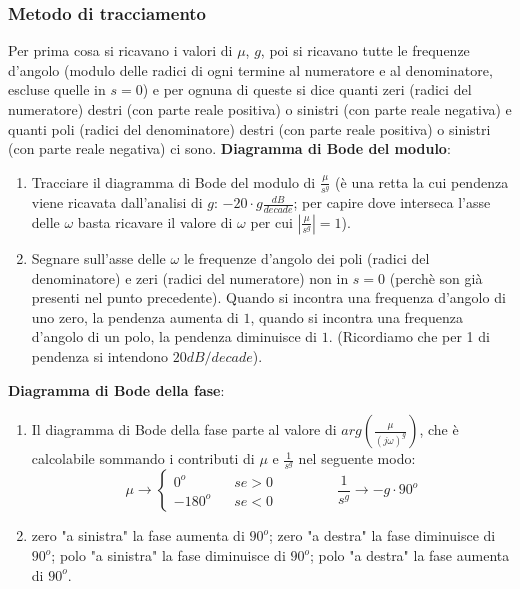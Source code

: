 \subsubsection{Metodo di tracciamento}
Per prima cosa si ricavano i valori di $\mu$, $g$, poi si ricavano tutte le frequenze d'angolo (modulo delle radici di ogni termine al numeratore e al denominatore, escluse quelle in $s=0$) e per ognuna di queste si dice quanti zeri (radici del numeratore) destri (con parte reale positiva) o sinistri (con parte reale negativa) e quanti poli (radici del denominatore) destri (con parte reale positiva) o sinistri (con parte reale negativa) ci sono.\newline
\textbf{Diagramma di Bode del modulo}: 
\begin{enumerate}
    \item Tracciare il diagramma di Bode del modulo di $\frac{\mu}{s^g}$ (è una retta la cui pendenza viene ricavata dall'analisi di $g$: $-20 \cdot g \frac{dB}{decade}$; per capire dove interseca l'asse delle $\omega$ basta ricavare il valore di $\omega$ per cui $\left| \frac{\mu}{s^g} \right| = 1$).
    \item Segnare sull'asse delle $\omega$ le frequenze d'angolo dei poli (radici del denominatore) e zeri (radici del numeratore) non in $s=0$ (perchè son già presenti nel punto precedente).\newline
    Quando si incontra una frequenza d'angolo di uno zero, la pendenza aumenta di $1$, quando si incontra una frequenza d'angolo di un polo, la pendenza diminuisce di $1$. (Ricordiamo che per 1 di pendenza si intendono $20 dB/decade$).
\end{enumerate}
\textbf{Diagramma di Bode della fase}:
\begin{enumerate}
    \item Il diagramma di Bode della fase parte al valore di $arg(\frac{\mu}{(j \omega)^g})$, che è calcolabile sommando i contributi di $\mu$ e $\frac{1}{s^g}$ nel seguente modo:
    \[
        \mu \rightarrow \begin{cases}
            0^o \;\;\;& se > 0\\
            -180^o \;\;\; & se <0
        \end{cases} \;\;\;\;\;\;\;\;\;\;\;\;\;\;\; \frac{1}{s^g}\rightarrow -g \cdot 90^o
    \]
    \item zero "a sinistra" la fase aumenta di $90^o$;\newline
    zero "a destra" la fase diminuisce di $90^o$;\newline
    polo "a sinistra" la fase diminuisce di $90^o$;\newline
    polo "a destra" la fase aumenta di $90^o$.
\end{enumerate}

